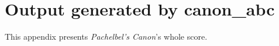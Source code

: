 \section{Output generated by canon\_abc}
\label{sec:pcanon}

This appendix presents \emph{Pachelbel's Canon}'s whole score.\\




